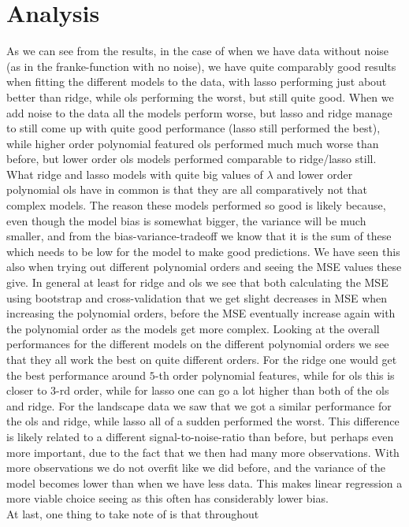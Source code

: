 \documentclass{article}
\begin{document}
\section{Analysis}
As we can see from the results, in the case of when we have data without noise
(as in the franke-function with no noise), we have quite comparably good results
when fitting the different models to the data, with lasso performing just about
better than ridge, while ols performing the worst, but still quite good. When we
add noise to the data all the models perform worse, but lasso and ridge manage
to still come up with quite good performance (lasso still performed the best),
while higher order polynomial featured ols performed much much worse than
before, but lower order ols models performed comparable to ridge/lasso still.
What ridge and lasso models with quite big values of $\lambda$ and lower order
polynomial ols have in common is that they are all comparatively not that
complex models. The reason these models performed so good is likely because,
even though the model bias is somewhat bigger, the variance will be much
smaller, and from the bias-variance-tradeoff we know that it is the sum of these
which needs to be low for the model to make good predictions. We have seen this
also when trying out different polynomial orders and seeing the MSE values these
give. In general at least for ridge and ols we see that both calculating the MSE
using bootstrap and cross-validation that we get slight decreases in MSE when
increasing the polynomial orders, before the MSE eventually increase again with
the polynomial order as the models get more complex. Looking at the overall
performances for the different models on the different polynomial orders we see
that they all work the best on quite different orders. For the ridge one would
get the best performance around $5$-th order polynomial features, while for ols
this is closer to $3$-rd order, while for lasso one can go a lot higher than
both of the ols and ridge.  For the landscape data we saw that we got a similar
performance for the ols and ridge, while lasso all of a sudden performed the
worst. This difference is likely related to a different signal-to-noise-ratio
than before, but perhaps even more important, due to the fact that we then had
many more observations. With more observations we do not overfit like we did
before, and the variance of the model becomes lower than when we have less data.
This makes linear regression a more viable choice seeing as this often has
considerably lower bias.\\ At last, one thing to take note of is that throughout
\end{document}
